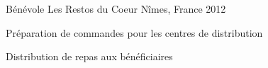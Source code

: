

\begin{cventries}

  \cventry
    {Bénévole} %
    {Les Restos du Coeur} %
    {Nîmes, France} %
    {2012} %
    {
      \begin{cvitems} %
        \item {Préparation de commandes pour les centres de distribution}
        \item {Distribution de repas aux bénéficiaires}
      \end{cvitems}
    }

\end{cventries}
